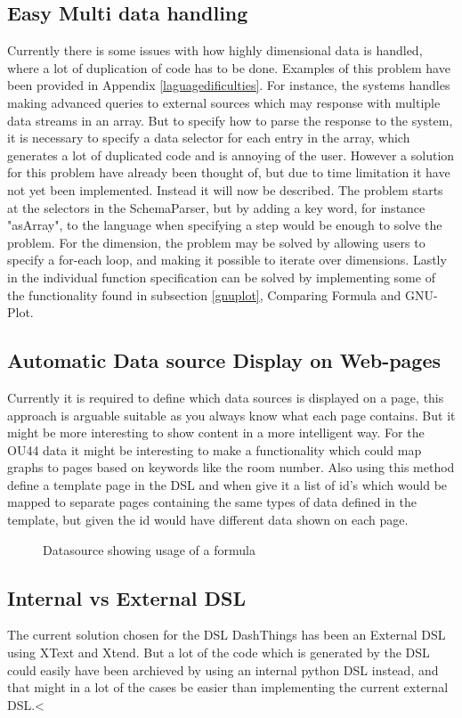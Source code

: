 \subsection{Easy Multi data handling} 
Currently there is some issues with how highly dimensional data is handled, where a lot of duplication of code has to be done.
Examples of this problem have been provided in Appendix \ref{laguagedificulties}.
For instance, the systems handles making advanced queries to external sources which may response with multiple data streams in an array. 
But to specify how to parse the response to the system, it is necessary to specify a data selector for each entry in the array, which generates a lot of duplicated code and is annoying of the user.
However a solution for this problem have already been thought of, but due to time limitation it have not yet been implemented. Instead it will now be described.
The problem starts at the selectors in the SchemaParser, but by adding a key word, for instance "asArray", to the language when specifying a step would be enough to solve the problem.
For the dimension, the problem may be solved by allowing users to specify a for-each loop, and making it possible to iterate over dimensions.
Lastly in the individual function specification can be solved by implementing some of the functionality found in subsection \ref{gnuplot}, Comparing Formula and GNU-Plot. 

\subsection{Automatic Data source Display on Web-pages} 
Currently it is required to define
which data sources is displayed on a page, this approach is arguable suitable as you always
know what each page contains. But it might be more interesting to show content in a more
intelligent way. For the OU44 data it might be interesting to make a functionality which could
map graphs to pages based on keywords like the room number. Also using this method define a
template page in the DSL and when give it a list of id's which would be mapped to separate pages
containing the same types of data defined in the template, but given the id would have different
data shown on each page.

\begin{figure}
  \caption{Datasource showing usage of a formula}
  \label{lst:datasource-formula}
  
\end{figure}

\subsection{Internal vs External DSL} The current solution chosen for the DSL DashThings has
been an External DSL using XText and Xtend. But a lot of the code which is generated by the DSL
could easily have been archieved by using an internal python DSL instead, and that might in a lot
of the cases be easier than implementing the current external DSL.<
 